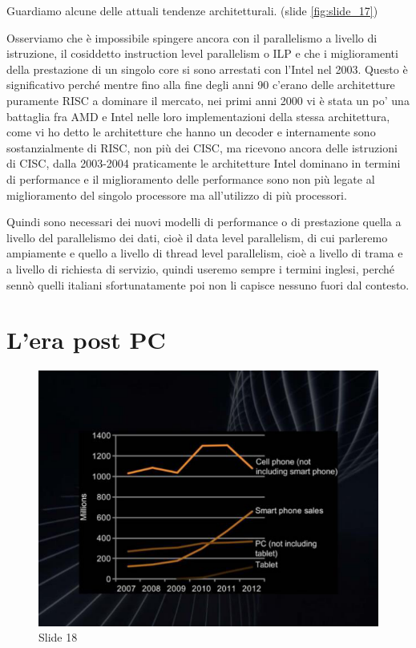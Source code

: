 Guardiamo alcune delle attuali tendenze architetturali. (slide \ref{fig:slide_17})

Osserviamo che è impossibile spingere ancora con il parallelismo a livello di istruzione, il cosiddetto instruction level parallelism o ILP e che i miglioramenti della prestazione di un singolo core si sono arrestati con l'Intel nel 2003.
Questo è significativo perché mentre fino alla fine degli anni 90 c'erano delle architetture puramente RISC a dominare il mercato, nei primi anni 2000 vi è stata un po' una battaglia fra AMD e Intel nelle loro implementazioni della stessa architettura, come vi ho detto le architetture che hanno un decoder e internamente sono sostanzialmente di RISC, non più dei CISC, ma ricevono ancora delle istruzioni di CISC, dalla 2003-2004 praticamente le architetture Intel dominano in termini di performance e il miglioramento delle performance sono non più legate al miglioramento del singolo processore ma all'utilizzo di più processori.

Quindi sono necessari dei nuovi modelli di performance o di prestazione quella a livello del parallelismo dei dati, cioè il data level parallelism, di cui parleremo ampiamente e quello a livello di thread level parallelism, cioè a livello di trama e a livello di richiesta di servizio, quindi useremo sempre i termini inglesi, perché sennò quelli italiani sfortunatamente poi non li capisce nessuno fuori dal contesto.

\section{L'era post PC}

\begin{figure}[ht]
    \centering
    \includegraphics[width=0.8\linewidth]{images/Lez01_p04_fig_01.png}
    \caption{Slide 18}
    \label{fig:slide_18}
\end{figure}


